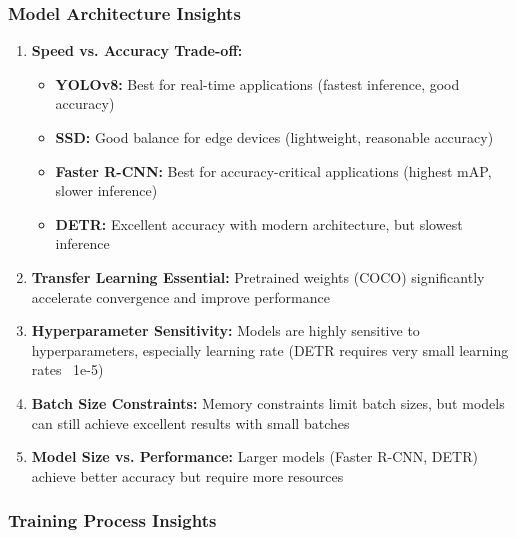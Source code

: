 \documentclass[12pt,a4paper]{article}
\begin{document}
\subsubsection{Model Architecture Insights}

\begin{enumerate}
    \item \textbf{Speed vs. Accuracy Trade-off:} 
    \begin{itemize}
        \item \textbf{YOLOv8:} Best for real-time applications (fastest inference, good accuracy)
        \item \textbf{SSD:} Good balance for edge devices (lightweight, reasonable accuracy)
        \item \textbf{Faster R-CNN:} Best for accuracy-critical applications (highest mAP, slower inference)
        \item \textbf{DETR:} Excellent accuracy with modern architecture, but slowest inference
    \end{itemize}
    \item \textbf{Transfer Learning Essential:} Pretrained weights (COCO) significantly accelerate convergence and improve performance
    \item \textbf{Hyperparameter Sensitivity:} Models are highly sensitive to hyperparameters, especially learning rate (DETR requires very small learning rates ~1e-5)
    \item \textbf{Batch Size Constraints:} Memory constraints limit batch sizes, but models can still achieve excellent results with small batches
    \item \textbf{Model Size vs. Performance:} Larger models (Faster R-CNN, DETR) achieve better accuracy but require more resources
\end{enumerate}

\subsubsection{Training Process Insights}
\end{document}
